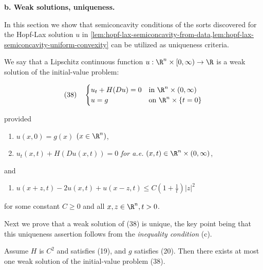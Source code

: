 \textbf{b. Weak solutions, uniqueness.}

In this section we show that semiconcavity conditions of the sorts discovered for the Hopf-Lax solution $u$ in \cref{lem:hopf-lax-semiconcavity-from-data,lem:hopf-lax-semiconcavity-uniform-convexity} can be utilized as uniqueness criteria.

\begin{definition}
\label{def:weak-solution-hamilton-jacobi}
We say that a Lipschitz continuous function $u : \R^n \times [0,\infty) \to \R$ is a weak solution of the initial-value problem:

$$(38) \quad \begin{cases} u_t + H(Du) = 0 & \text{in } \R^n \times (0,\infty) \\ u = g & \text{on } \R^n \times \{t = 0\} \end{cases}$$

provided
\begin{enumerate}
\item[(a)] $u(x,0) = g(x)$ $(x \in \R^n)$,
\item[(b)] $u_t(x,t) + H(Du(x,t)) = 0$ \textit{for a.e.} $(x,t) \in \R^n \times (0,\infty)$,
\end{enumerate}
and
\begin{enumerate}
\item[(c)] $u(x+z,t) - 2u(x,t) + u(x-z,t) \leq C \left(1 + \frac{1}{t}\right)|z|^2$
\end{enumerate}
for some constant $C \geq 0$ and all $x, z \in \R^n, t > 0$.
\end{definition}

Next we prove that a weak solution of (38) is unique, the key point being that this uniqueness assertion follows from the \textit{inequality condition} (c).

\begin{theorem}
\label{thm:uniqueness-weak-solutions-hj}
Assume $H$ is $C^2$ and satisfies (19), and $g$ satisfies (20). Then there exists at most one weak solution of the initial-value problem (38).
\end{theorem}

